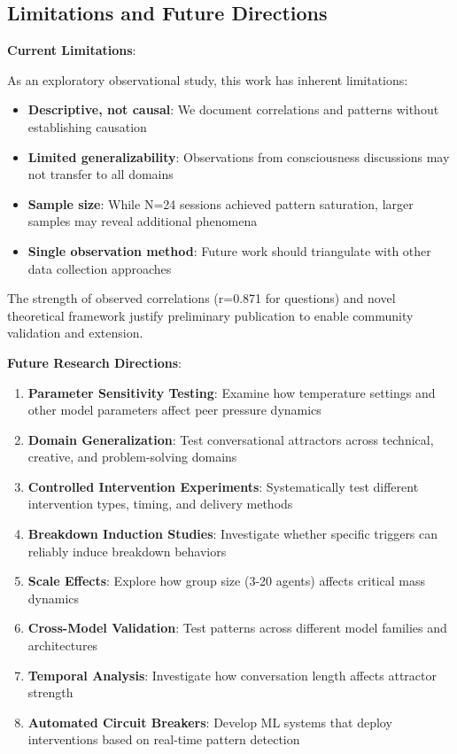 \documentclass[11pt,letterpaper]{article}
\newcommand{\exponedataTotalSessionsRaw}{24}
\newcommand{\exponedataTotalSessions}{N=\exponedataTotalSessionsRaw}
\newcommand{\exponedataQuestionCorrelation}{0.871}
\begin{document}
\subsection{Limitations and Future Directions}

\textbf{Current Limitations}:

As an exploratory observational study, this work has inherent limitations:
\begin{itemize}
    \item \textbf{Descriptive, not causal}: We document correlations and patterns without establishing causation
    \item \textbf{Limited generalizability}: Observations from consciousness discussions may not transfer to all domains
    \item \textbf{Sample size}: While \exponedataTotalSessions{} sessions achieved pattern saturation, larger samples may reveal additional phenomena
    \item \textbf{Single observation method}: Future work should triangulate with other data collection approaches
\end{itemize}

The strength of observed correlations (r=\exponedataQuestionCorrelation{} for questions) and novel theoretical framework justify preliminary publication to enable community validation and extension.

\textbf{Future Research Directions}:

\begin{enumerate}
    \item \textbf{Parameter Sensitivity Testing}: Examine how temperature settings and other model parameters affect peer pressure dynamics
    \item \textbf{Domain Generalization}: Test conversational attractors across technical, creative, and problem-solving domains
    \item \textbf{Controlled Intervention Experiments}: Systematically test different intervention types, timing, and delivery methods
    \item \textbf{Breakdown Induction Studies}: Investigate whether specific triggers can reliably induce breakdown behaviors
    \item \textbf{Scale Effects}: Explore how group size (3-20 agents) affects critical mass dynamics
    \item \textbf{Cross-Model Validation}: Test patterns across different model families and architectures
    \item \textbf{Temporal Analysis}: Investigate how conversation length affects attractor strength
    \item \textbf{Automated Circuit Breakers}: Develop ML systems that deploy interventions based on real-time pattern detection
\end{enumerate}
\end{document}
